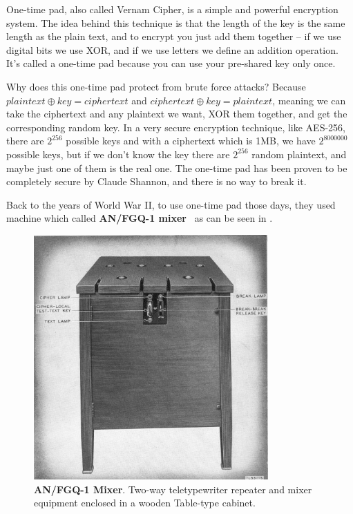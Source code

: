 One-time pad, also called Vernam Cipher, is a simple and powerful encryption
system. The idea behind this technique is that the length of the key is the same
length as the plain text, and to encrypt you just add them together – if we use
digital bits we use XOR, and if we use letters we define an addition operation.
It's called a one-time pad because you can use your pre-shared key only once.

Why does this one-time pad protect from brute force attacks? Because $plaintext
\oplus key = ciphertext$ and $ciphertext \oplus key = plaintext$, meaning we can
take the ciphertext and any plaintext we want, XOR them together, and get the
corresponding random key. In a very secure encryption technique, like AES-256,
there are \(2^{256}\) possible keys and with a ciphertext which is 1MB, we have
\(2^{8000000}\) possible keys, but if we don't know the key there are
\(2^{256}\) random plaintext, and maybe just one of them is the real one. The
one-time pad has been proven to be completely secure by Claude Shannon, and
there is no way to break it.

Back to the years of World War II, to use one-time pad those days, they used
machine which called \textbf{AN/FGQ-1 mixer}~\cite{cryptoMix} as can be seen in
.

\begin{figure}[!ht]
    \centering
    \includegraphics[width=0.8\textwidth]{images/ch1_Intro/MIxer.jpg}
    \caption{\textbf{AN/FGQ-1 Mixer}. Two-way teletypewriter repeater and mixer equipment enclosed in a wooden Table-type cabinet.} \label{fig:Mixer}
\end{figure}

